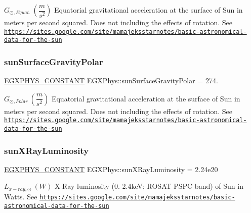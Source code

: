 $ G_{\odot,Equat.} \ (\dfrac{m}{s^2})$ Equatorial gravitational acceleration at the surface of Sun in meters per second squared. Does not including the effects of rotation. See \href{https://sites.google.com/site/mamajeksstarnotes/basic-astronomical-data-for-the-sun}{\tt https\+://sites.\+google.\+com/site/mamajeksstarnotes/basic-\/astronomical-\/data-\/for-\/the-\/sun} \mbox{\label{group___e_g_x_phys-_constants-_astrophysics-_solar_system-_sun-_bulk_gae9187886dbbd7298e5a1d257a2365e9f}} 
\subsubsection{\texorpdfstring{sun\+Surface\+Gravity\+Polar}{sunSurfaceGravityPolar}}
{\footnotesize\ttfamily \mbox{\hyperlink{group___e_g_x_phys-_constants-_macros_ga76980d288494ce1714c9ac68a95ba702}{E\+G\+X\+P\+H\+Y\+S\+\_\+\+C\+O\+N\+S\+T\+A\+NT}} E\+G\+X\+Phys\+::sun\+Surface\+Gravity\+Polar = 274.}

$ G_{\odot,Polar} \ (\dfrac{m}{s^2})$ Equatorial gravitational acceleration at the surface of Sun in meters per second squared. Does not including the effects of rotation. See \href{https://sites.google.com/site/mamajeksstarnotes/basic-astronomical-data-for-the-sun}{\tt https\+://sites.\+google.\+com/site/mamajeksstarnotes/basic-\/astronomical-\/data-\/for-\/the-\/sun} \mbox{\label{group___e_g_x_phys-_constants-_astrophysics-_solar_system-_sun-_bulk_ga088d6c6b1f9cc7098af2da77e94a386a}} 
\subsubsection{\texorpdfstring{sun\+X\+Ray\+Luminosity}{sunXRayLuminosity}}
{\footnotesize\ttfamily \mbox{\hyperlink{group___e_g_x_phys-_constants-_macros_ga76980d288494ce1714c9ac68a95ba702}{E\+G\+X\+P\+H\+Y\+S\+\_\+\+C\+O\+N\+S\+T\+A\+NT}} E\+G\+X\+Phys\+::sun\+X\+Ray\+Luminosity = 2.\+24e20}

$L_{x-ray,\odot} \ (W)$ X-\/\+Ray luminosity (0.-\/2.\+4keV; R\+O\+S\+AT P\+S\+PC band) of Sun in Watts. See \href{https://sites.google.com/site/mamajeksstarnotes/basic-astronomical-data-for-the-sun}{\tt https\+://sites.\+google.\+com/site/mamajeksstarnotes/basic-\/astronomical-\/data-\/for-\/the-\/sun} 
